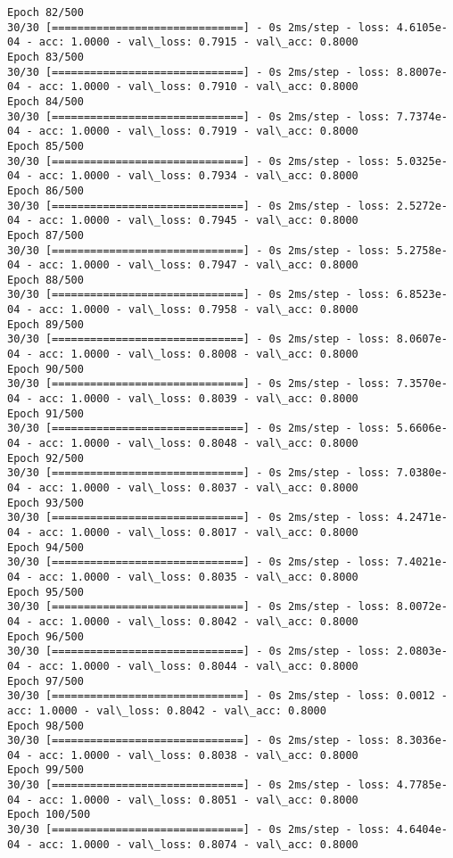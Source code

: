 \documentclass[11pt]{article}
\begin{document}
\begin{Verbatim}[commandchars=\\\{\}]
Epoch 82/500
30/30 [==============================] - 0s 2ms/step - loss: 4.6105e-04 - acc: 1.0000 - val\_loss: 0.7915 - val\_acc: 0.8000
Epoch 83/500
30/30 [==============================] - 0s 2ms/step - loss: 8.8007e-04 - acc: 1.0000 - val\_loss: 0.7910 - val\_acc: 0.8000
Epoch 84/500
30/30 [==============================] - 0s 2ms/step - loss: 7.7374e-04 - acc: 1.0000 - val\_loss: 0.7919 - val\_acc: 0.8000
Epoch 85/500
30/30 [==============================] - 0s 2ms/step - loss: 5.0325e-04 - acc: 1.0000 - val\_loss: 0.7934 - val\_acc: 0.8000
Epoch 86/500
30/30 [==============================] - 0s 2ms/step - loss: 2.5272e-04 - acc: 1.0000 - val\_loss: 0.7945 - val\_acc: 0.8000
Epoch 87/500
30/30 [==============================] - 0s 2ms/step - loss: 5.2758e-04 - acc: 1.0000 - val\_loss: 0.7947 - val\_acc: 0.8000
Epoch 88/500
30/30 [==============================] - 0s 2ms/step - loss: 6.8523e-04 - acc: 1.0000 - val\_loss: 0.7958 - val\_acc: 0.8000
Epoch 89/500
30/30 [==============================] - 0s 2ms/step - loss: 8.0607e-04 - acc: 1.0000 - val\_loss: 0.8008 - val\_acc: 0.8000
Epoch 90/500
30/30 [==============================] - 0s 2ms/step - loss: 7.3570e-04 - acc: 1.0000 - val\_loss: 0.8039 - val\_acc: 0.8000
Epoch 91/500
30/30 [==============================] - 0s 2ms/step - loss: 5.6606e-04 - acc: 1.0000 - val\_loss: 0.8048 - val\_acc: 0.8000
Epoch 92/500
30/30 [==============================] - 0s 2ms/step - loss: 7.0380e-04 - acc: 1.0000 - val\_loss: 0.8037 - val\_acc: 0.8000
Epoch 93/500
30/30 [==============================] - 0s 2ms/step - loss: 4.2471e-04 - acc: 1.0000 - val\_loss: 0.8017 - val\_acc: 0.8000
Epoch 94/500
30/30 [==============================] - 0s 2ms/step - loss: 7.4021e-04 - acc: 1.0000 - val\_loss: 0.8035 - val\_acc: 0.8000
Epoch 95/500
30/30 [==============================] - 0s 2ms/step - loss: 8.0072e-04 - acc: 1.0000 - val\_loss: 0.8042 - val\_acc: 0.8000
Epoch 96/500
30/30 [==============================] - 0s 2ms/step - loss: 2.0803e-04 - acc: 1.0000 - val\_loss: 0.8044 - val\_acc: 0.8000
Epoch 97/500
30/30 [==============================] - 0s 2ms/step - loss: 0.0012 - acc: 1.0000 - val\_loss: 0.8042 - val\_acc: 0.8000
Epoch 98/500
30/30 [==============================] - 0s 2ms/step - loss: 8.3036e-04 - acc: 1.0000 - val\_loss: 0.8038 - val\_acc: 0.8000
Epoch 99/500
30/30 [==============================] - 0s 2ms/step - loss: 4.7785e-04 - acc: 1.0000 - val\_loss: 0.8051 - val\_acc: 0.8000
Epoch 100/500
30/30 [==============================] - 0s 2ms/step - loss: 4.6404e-04 - acc: 1.0000 - val\_loss: 0.8074 - val\_acc: 0.8000

\end{Verbatim}
\end{document}
